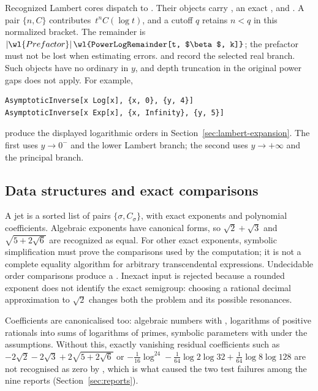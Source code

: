 Recognized Lambert cores dispatch to . Their objects carry , an exact , and . A pair $\{n,C\}$ contributes $\,t^nC(\log t)$, and a cutoff $q$ retains $n<q$ in this normalized bracket. The remainder is $|\wl{Prefactor}|\,\wl{PowerLogRemainder[t, $\beta$, k]}$; the prefactor must not be lost when estimating errors.  and  record the selected real branch. Such objects have no ordinary  in $y$, and depth truncation in the original power gaps does not apply. For example,
\begin{lstlisting}
AsymptoticInverse[x Log[x], {x, 0}, {y, 4}]
AsymptoticInverse[x Exp[x], {x, Infinity}, {y, 5}]
\end{lstlisting}
produce the displayed logarithmic orders in Section~\ref{sec:lambert-expansion}. The first uses $y\to0^-$ and the lower Lambert branch; the second uses $y\to+\infty$ and the principal branch.

\subsection{Data structures and exact comparisons}

A jet is a sorted list of pairs $\{\sigma,C_\sigma\}$, with exact exponents and polynomial coefficients. Algebraic exponents have  canonical forms, so $\sqrt2+\sqrt3$ and $\sqrt{5+2\sqrt6}$ are recognized as equal. For other exact exponents, symbolic simplification must prove the comparisons used by the computation; it is not a complete equality algorithm for arbitrary transcendental expressions. Undecidable order comparisons produce a . Inexact  input is rejected because a rounded exponent does not identify the exact semigroup: choosing a rational decimal approximation to $\sqrt2$ changes both the problem and its possible resonances.

Coefficients are canonicalised too: algebraic numbers with , logarithms of positive rationals into sums of logarithms of primes, symbolic parameters with  under the assumptions. Without this, exactly vanishing residual coefficients such as $-2\sqrt2-2\sqrt3+2\sqrt{5+2\sqrt6}$ or $-\tfrac1{16}\log^24-\tfrac1{64}\log2\log32+\tfrac1{64}\log8\log128$ are not recognised as zero by , which is what caused the two test failures among the nine reports (Section~\ref{sec:reports}).

